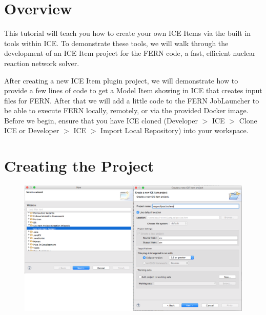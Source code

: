 \section{Overview} 

This tutorial will teach you how to
create your own ICE Items via the built in tools within ICE.  To demonstrate
these tools, we will walk through the development of an ICE Item project for the
FERN code, a fast, efficient nuclear reaction network solver. 

After creating a new ICE Item plugin project, we will demonstrate how to
provide a few lines of code to get a Model Item showing in ICE that creates
input files for FERN. After that we will add a little code to the FERN
JobLauncher to be able to execute FERN locally, remotely, or via the
provided Docker image. Before we begin, ensure that you have ICE cloned
(Developer $>$ ICE $>$ Clone ICE or Developer $>$ ICE $>$ Import Local
Repository) into your workspace.


\section{Creating the Project}

\begin{figure}[h]
\centering
\includegraphics[width=\textwidth]{figures/comb12.png}
\label{fig:comb12}
\end{figure}

